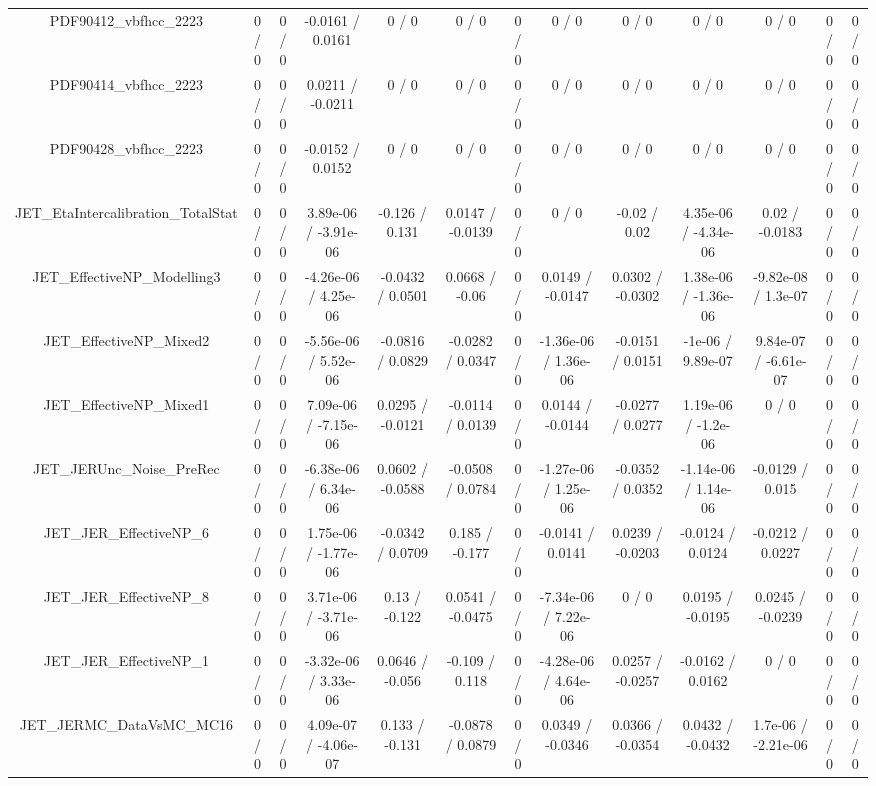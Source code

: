 \documentclass[10pt]{article}
\begin{document}
\begin{table}[htbp]
\begin{center}
\begin{tabular}{|c|c|c|c|c|c|c|c|c|c|c|c|c|}
  PDF90412_vbfhcc_2223 & 0 / 0 & 0 / 0 & -0.0161 / 0.0161 & 0 / 0 & 0 / 0 & 0 / 0 & 0 / 0 & 0 / 0 & 0 / 0 & 0 / 0 & 0 / 0 & 0 / 0 \\ 
  PDF90414_vbfhcc_2223 & 0 / 0 & 0 / 0 & 0.0211 / -0.0211 & 0 / 0 & 0 / 0 & 0 / 0 & 0 / 0 & 0 / 0 & 0 / 0 & 0 / 0 & 0 / 0 & 0 / 0 \\ 
  PDF90428_vbfhcc_2223 & 0 / 0 & 0 / 0 & -0.0152 / 0.0152 & 0 / 0 & 0 / 0 & 0 / 0 & 0 / 0 & 0 / 0 & 0 / 0 & 0 / 0 & 0 / 0 & 0 / 0 \\ 
  JET_EtaIntercalibration_TotalStat & 0 / 0 & 0 / 0 & 3.89e-06 / -3.91e-06 & -0.126 / 0.131 & 0.0147 / -0.0139 & 0 / 0 & 0 / 0 & -0.02 / 0.02 & 4.35e-06 / -4.34e-06 & 0.02 / -0.0183 & 0 / 0 & 0 / 0 \\ 
  JET_EffectiveNP_Modelling3 & 0 / 0 & 0 / 0 & -4.26e-06 / 4.25e-06 & -0.0432 / 0.0501 & 0.0668 / -0.06 & 0 / 0 & 0.0149 / -0.0147 & 0.0302 / -0.0302 & 1.38e-06 / -1.36e-06 & -9.82e-08 / 1.3e-07 & 0 / 0 & 0 / 0 \\ 
  JET_EffectiveNP_Mixed2 & 0 / 0 & 0 / 0 & -5.56e-06 / 5.52e-06 & -0.0816 / 0.0829 & -0.0282 / 0.0347 & 0 / 0 & -1.36e-06 / 1.36e-06 & -0.0151 / 0.0151 & -1e-06 / 9.89e-07 & 9.84e-07 / -6.61e-07 & 0 / 0 & 0 / 0 \\ 
  JET_EffectiveNP_Mixed1 & 0 / 0 & 0 / 0 & 7.09e-06 / -7.15e-06 & 0.0295 / -0.0121 & -0.0114 / 0.0139 & 0 / 0 & 0.0144 / -0.0144 & -0.0277 / 0.0277 & 1.19e-06 / -1.2e-06 & 0 / 0 & 0 / 0 & 0 / 0 \\ 
  JET_JERUnc_Noise_PreRec & 0 / 0 & 0 / 0 & -6.38e-06 / 6.34e-06 & 0.0602 / -0.0588 & -0.0508 / 0.0784 & 0 / 0 & -1.27e-06 / 1.25e-06 & -0.0352 / 0.0352 & -1.14e-06 / 1.14e-06 & -0.0129 / 0.015 & 0 / 0 & 0 / 0 \\ 
  JET_JER_EffectiveNP_6 & 0 / 0 & 0 / 0 & 1.75e-06 / -1.77e-06 & -0.0342 / 0.0709 & 0.185 / -0.177 & 0 / 0 & -0.0141 / 0.0141 & 0.0239 / -0.0203 & -0.0124 / 0.0124 & -0.0212 / 0.0227 & 0 / 0 & 0 / 0 \\ 
  JET_JER_EffectiveNP_8 & 0 / 0 & 0 / 0 & 3.71e-06 / -3.71e-06 & 0.13 / -0.122 & 0.0541 / -0.0475 & 0 / 0 & -7.34e-06 / 7.22e-06 & 0 / 0 & 0.0195 / -0.0195 & 0.0245 / -0.0239 & 0 / 0 & 0 / 0 \\ 
  JET_JER_EffectiveNP_1 & 0 / 0 & 0 / 0 & -3.32e-06 / 3.33e-06 & 0.0646 / -0.056 & -0.109 / 0.118 & 0 / 0 & -4.28e-06 / 4.64e-06 & 0.0257 / -0.0257 & -0.0162 / 0.0162 & 0 / 0 & 0 / 0 & 0 / 0 \\ 
  JET_JERMC_DataVsMC_MC16 & 0 / 0 & 0 / 0 & 4.09e-07 / -4.06e-07 & 0.133 / -0.131 & -0.0878 / 0.0879 & 0 / 0 & 0.0349 / -0.0346 & 0.0366 / -0.0354 & 0.0432 / -0.0432 & 1.7e-06 / -2.21e-06 & 0 / 0 & 0 / 0 \\ 

\end{tabular}
\end{center}
\end{table}
\end{document}
